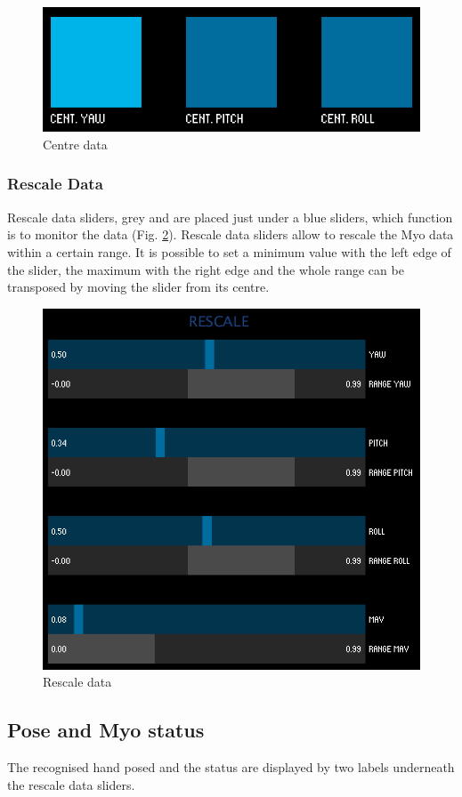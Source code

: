 \documentclass[12pt,a4paper]{article}
\begin{document}
		\begin{figure}[h]
			\centering
			\includegraphics[width=0.6\linewidth]{../MyoMapper-Centr}
			\caption{Centre data}
			\label{fig:MyoMapper-Centr}
		\end{figure}		
		
		\subsubsection*{Rescale Data}
		Rescale data sliders, grey and are placed just under a blue sliders, which function is to monitor the data (Fig. \ref{fig:MyoMapper-Rescale}).  Rescale data sliders allow to rescale the Myo data within a certain range. It is possible to set a minimum value with the left edge of the slider, the maximum with the right edge and the whole range can be transposed by moving the slider from its centre.
		
		\begin{figure}[h]
			\centering
			\includegraphics[width=0.6\linewidth]{../MyoMapper-Rescale}
			\caption{Rescale data}
			\label{fig:MyoMapper-Rescale}
		\end{figure}
	
	\subsection{Pose and Myo status}
	The recognised hand posed and the status are displayed by two labels underneath the rescale data sliders.
	
\end{document}

